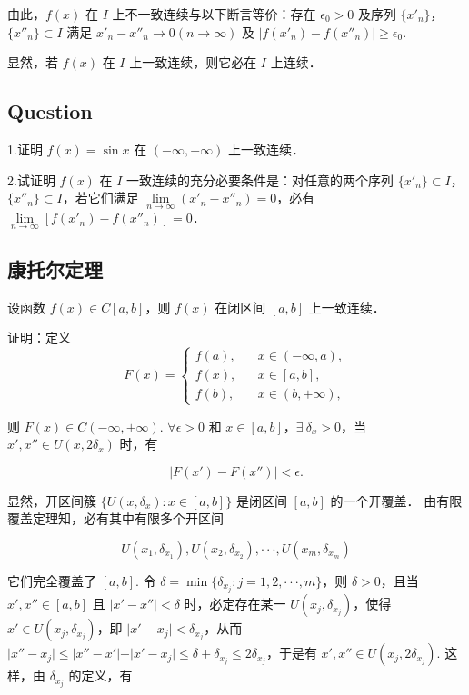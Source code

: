   由此，$f(x)$ 在 $I$ 上不一致连续与以下断言等价：存在 $\epsilon_0>0$ 及序列 $\{x'_n\}$，$\{x''_n\}\subset I$ 满足 $x'_n-x''_n\rightarrow0(n\rightarrow\infty)$ 及 $\vert f(x'_n)-f(x''_n)\vert\geq\epsilon_0$.

  显然，若 $f(x)$ 在 $I$ 上一致连续，则它必在 $I$ 上连续．

\subsection{Question}

1.证明 $f(x)=\sin x$ 在 $(-\infty,+\infty)$ 上一致连续．

2.试证明 $f(x)$ 在 $I$ 一致连续的充分必要条件是：对任意的两个序列 $\{x'_n\}\subset I$，$\{x''_n\}\subset I$，若它们满足 $\lim\limits_{n\rightarrow\infty}(x'_n-x''_n)=0$，必有 $\lim\limits_{n\rightarrow\infty}[f(x'_n)-f(x''_n)]=0$．

\subsection{康托尔定理}

设函数 $f(x)\in C[a,b]$，则 $f(x)$ 在闭区间 $[a,b]$ 上一致连续．

证明：定义
$$
F(x)=\left\{
\begin{matrix}
f(a),\ \ \ \ &x\in(-\infty,a),\\
f(x),\ \ \ \ &x\in[a,b],\\
f(b),\ \ \ \ &x\in(b,+\infty),
\end{matrix}
\right.
$$

则 $F(x)\in C(-\infty,+\infty)$. $\forall \epsilon>0$ 和 $x\in[a,b]$，$\exists\ \delta_x>0$，当 $x',x''\in U(x,2\delta_x)$ 时，有

$$
\vert F(x')-F(x'')\vert<\epsilon.
$$

显然，开区间簇 $\{U(x,\delta_x):x\in[a,b]\}$ 是闭区间 $[a,b]$ 的一个开覆盖． 由有限覆盖定理知，必有其中有限多个开区间

$$
U(x_1,\delta_{x_1}),U(x_2,\delta_{x_2}),\cdot\cdot\cdot,U(x_m,\delta_{x_m})
$$

它们完全覆盖了 $[a,b]$. 令 $\delta=\min\{\delta_{x_j}:j=1,2,\cdot\cdot\cdot,m\}$，则 $\delta>0$，且当 $x',x''\in[a,b]$ 且 $\vert x'-x''\vert<\delta$ 时，必定存在某一 $U(x_j,\delta_{x_j})$，使得 $x'\in U(x_j,\delta_{x_j})$，即 $\vert x'-x_j\vert<\delta_{x_j}$，从而 $\vert x''-x_j\vert\leq\vert x''-x'\vert+\vert x'-x_j\vert\leq\delta+\delta_{x_j}\leq2\delta_{x_j}$，于是有 $x',x''\in U(x_j,2\delta_{x_j})$. 这样，由 $\delta_{x_j}$ 的定义，有

